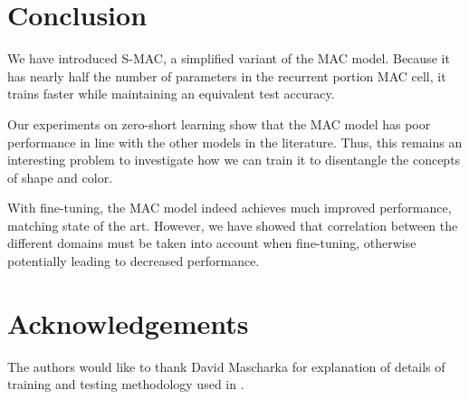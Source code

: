 \section{Conclusion}
\label{sec:conclusion}


We have introduced S-MAC, a simplified variant of the MAC model. Because it has nearly half the number of parameters in the recurrent portion MAC cell, it trains faster while maintaining an equivalent test accuracy. 

Our experiments on zero-short learning show that the MAC model has poor performance in line with the other models in the literature. Thus, this remains an interesting problem to investigate how we can train it to disentangle the concepts of shape and color.

With fine-tuning, the MAC model indeed achieves much improved performance, matching state of the art. However, we have showed that correlation between the different domains must be taken into account when fine-tuning, otherwise potentially leading to decreased performance.

\section*{Acknowledgements}
The authors would like to thank David Mascharka for explanation of details of training and testing methodology used in \cite{mascharka2018transparency}. 	